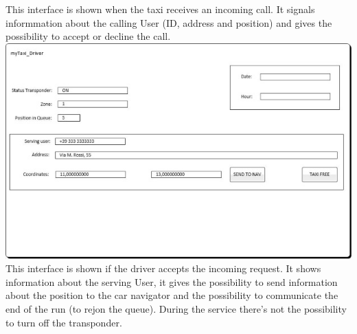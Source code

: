 \documentclass[12pt,a4paper]{book}
\begin{document}
				\hfill\break
				This interface is shown when the taxi receives an incoming call. It signals informmation about the calling User (ID, address and position) and gives the possibility to accept or decline the call.
				\hfill\break
				\hfill\break
				\includegraphics {driver_page4}
				\hfill\break
				This interface is shown if the driver accepts the incoming request. It shows information about the serving User, it gives the possibility to send information about the position  to the car navigator and the possibility to communicate the end of the run (to rejon the queue). During the service there's not the possibility to turn off the transponder.
\end{document}
